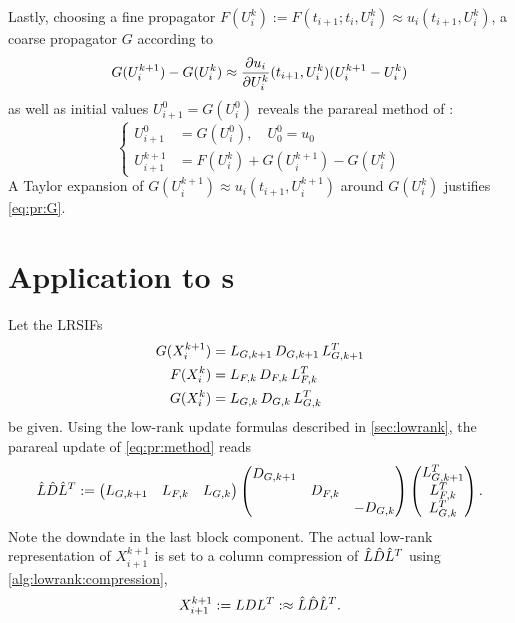 Lastly, choosing a fine propagator $F(U^k_i) := F(t_{i+1}; t_i, U^k_i) \approx u_i(t_{i+1}, U^k_i)$,
a coarse propagator $G$ according to
\begin{equation}
  \label{eq:pr:G}
  G(U^{k+1}_i) - G(U^k_i)
  \approx
  \pdiff{U^k_i}{u_i}(t_{i+1}, U^k_i) (U^{k+1}_i - U^k_i)
\end{equation}
as well as initial values $ U^0_{i+1} = G(U^0_i) $
reveals the parareal method of \cite{Baffico2002}:
\begin{equation}
  \left\{
  \begin{aligned}
    U^0_{i+1} &= G(U^0_i),
    \quad
    U^0_0 = u_0 \\
    U^{k+1}_{i+1} &= F(U^k_i) + G(U^{k+1}_i) - G(U^k_i)
  \end{aligned}
  \right.
\end{equation}
A Taylor expansion of $G(U^{k+1}_i) \approx u_i(t_{i+1}, U^{k+1}_i)$ around $G(U^k_i)$ justifies \eqref{eq:pr:G}.

\section{Application to s}
\label{sec:pr:DRE}


Let the \acp{LRSIF}
\begin{equation}
\begin{aligned}
  G(X^{k+1}_i) &= \mathop{L_{G,k+1}} \mathop{D_{G,k+1}} \mathop{L_{G,k+1}^T} \\
  F(X^k_i)     &= \mathop{L_{F,k}}   \mathop{D_{F,k}}   \mathop{L_{F,k}^T} \\
  G(X^k_i)     &= \mathop{L_{G,k}}   \mathop{D_{G,k}}   \mathop{L_{G,k}^T}
\end{aligned}
\end{equation}
be given.
Using the low-rank update formulas described in \autoref{sec:lowrank},
the parareal update of \eqref{eq:pr:method} reads
\begin{equation}
  \hat L \hat D \hat L^T :=
  \begin{pmatrix}
    L_{G,k+1} &
    L_{F,k} &
    L_{G,k}
  \end{pmatrix}
  \begin{pmatrix}
    D_{G,k+1} \\
    & D_{F,k} \\
    && -D_{G,k}
  \end{pmatrix}
  \begin{pmatrix}
    L_{G,k+1}^T \\
    L_{F,k}^T \\
    L_{G,k}^T
  \end{pmatrix}
  .
\end{equation}
Note the downdate in the last block component.
The actual low-rank representation of $X^{k+1}_{i+1}$ is set to a column compression of $\hat L \hat D \hat L^T$
using \autoref{alg:lowrank:compression},
\begin{equation}
  X^{k+1}_{i+1}
  := LDL^T
  :\approx \hat L \hat D \hat L^T
  .
\end{equation}


